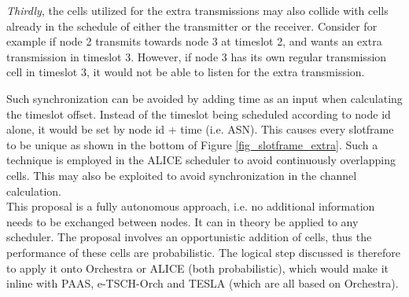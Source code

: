 \documentclass[journal,comsoc]{IEEEtran}
\begin{document}
\textit{Thirdly}, the cells utilized for the extra transmissions may also collide with cells already in the schedule of either the transmitter or the receiver. Consider for example if node 2 transmits towards node 3 at timeslot 2, and wants an extra transmission in timeslot 3. However, if node 3 has its own regular transmission cell in timeslot 3, it would not be able to listen for the extra transmission.

Such synchronization can be avoided by adding time as an input when calculating the timeslot offset. Instead of the timeslot being scheduled according to node id alone, it would be set by node id + time (i.e. ASN). This causes every slotframe to be unique as shown in the bottom of Figure \ref{fig_slotframe_extra}. Such a technique is employed in the ALICE scheduler to avoid continuously overlapping cells. This may also be exploited to avoid synchronization in the channel calculation.\\

This proposal is a fully autonomous approach, i.e. no additional information needs to be exchanged between nodes. It can in theory be applied to any scheduler. The proposal involves an opportunistic addition of cells, thus the performance of these cells are probabilistic. The logical step discussed is therefore to apply it onto Orchestra or ALICE (both probabilistic), which would make it inline with PAAS, e-TSCH-Orch and TESLA (which are all based on Orchestra).%



\end{document}
